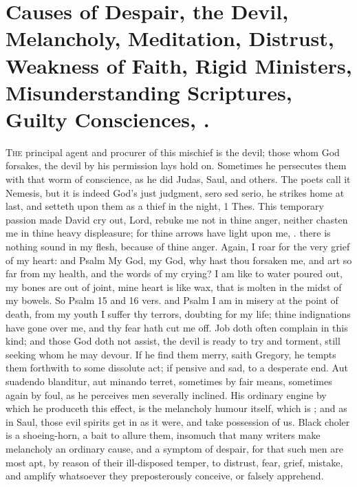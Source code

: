 {\section[Causes of Despair]{Causes of Despair, the Devil, Melancholy, Meditation, Distrust, Weakness of Faith, Rigid Ministers, Misunderstanding Scriptures, Guilty Consciences, \etc{}.}
\lettrine{T}{he} principal agent and procurer of this mischief is the devil; those
whom God forsakes, the devil by his permission lays hold on. Sometimes
he persecutes them with that worm of conscience, as he did Judas,
Saul, and others. The poets call it Nemesis, but it is indeed
God's just judgment, sero sed serio, he strikes home at last, and
setteth upon them as a thief in the night, 1 Thes.  This
temporary passion made David cry out, Lord, rebuke me not in thine
anger, neither chasten me in thine heavy displeasure; for thine arrows
have light upon me, \etc{}. there is nothing sound in my flesh, because of
thine anger. Again, I roar for the very grief of my heart: and Psalm
 My God, my God, why hast thou forsaken me, and art so far from my
health, and the words of my crying? I am like to water poured out, my
bones are out of joint, mine heart is like wax, that is molten in the
midst of my bowels. So Psalm  15 and 16 vers. and Psalm  I
am in misery at the point of death, from my youth I suffer thy terrors,
doubting for my life; thine indignations have gone over me, and thy
fear hath cut me off. Job doth often complain in this kind; and those
God doth not assist, the devil is ready to try and torment, still
seeking whom he may devour. If he find them merry, saith Gregory, he
tempts them forthwith to some dissolute act; if pensive and sad, to a
desperate end. Aut suadendo blanditur, aut minando terret, sometimes by
fair means, sometimes again by foul, as he perceives men severally
inclined. His ordinary engine by which he produceth this effect, is the
melancholy humour itself, which is ;
and as in Saul, those evil spirits get in as it were, and take
possession of us. Black choler is a shoeing-horn, a bait to allure
them, insomuch that many writers make melancholy an ordinary cause, and
a symptom of despair, for that such men are most apt, by reason of
their ill-disposed temper, to distrust, fear, grief, mistake, and
amplify whatsoever they preposterously conceive, or falsely apprehend.

}
